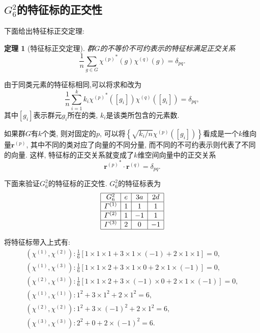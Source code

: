 \documentclass[UTF8]{ctexart}
\newtheorem{thm}{定理}
\begin{document}
\subsection{$G_6^2$的特征标的正交性}
下面给出特征标正交定理:
\begin{thm}[特征标正交定理]
  群$G$的不等价不可约表示的特征标满足正交关系
  \begin{equation}
    \frac{1}{n} \sum_{g \in G} {\chi^{(p)}}^{*} (g) \chi^{(q)} (g) = \delta_{pq}.
  \end{equation}
\end{thm}

由于同类元素的特征标相同,可以将求和改为
\begin{equation}
  \frac{1}{n} \sum_{i = 1}^{k} k_i {\chi^{(p)}}^{*} ([g_i]) \chi^{(q)}([g_i]) = \delta_{pq},
\end{equation}
其中$[g_i]$表示群元$g_i$所在的类, $k_i$是该类所包含的元素数.

如果群$G$有$k$个类, 则对固定的$p$, 可以将$\left\{ \sqrt{k_i/n} \chi^{(p)}([g_i]) \right\}$看成是一个$k$维向量$\bm{r}^{(p)}$, 其中不同的类对应了向量的不同分量, 而不同的不可约表示则代表了不同的向量. 这样, 特征标的正交关系就变成了$k$维空间向量中的正交关系
\begin{equation}
  {\bm{r}^{(p)}}^{*} \cdot \bm{r}^{(q)} = \delta_{pq}.
\end{equation}

下面来验证$G_6^2$的特征标的正交性. $G_6^2$的特征标表为
\begin{equation}
  \begin{array}{|c|c|c|c|}
    \hline
    G_6^2 & e & 3a & 2d \\
    \hline
    \varGamma^{(1)} & 1 & 1 & 1 \\
    \hline
    \varGamma^{(2)} & 1 & -1 & 1 \\
    \hline
    \varGamma^{(3)} & 2 & 0 & -1 \\
    \hline
  \end{array}
\end{equation}

将特征标带入上式有:
\begin{gather}
  (\chi^{(1)}, \chi^{(2)}) : \frac{1}{6} [1\times 1\times 1 + 3\times 1\times (-1) + 2 \times 1 \times 1] = 0, \\
  (\chi^{(1)}, \chi^{(3)}) : \frac{1}{6} [1\times 1\times 2 + 3\times 1\times 0 + 2 \times 1 \times (-1)] = 0, \\
  (\chi^{(2)}, \chi^{(3)}) : \frac{1}{6} [1\times 1\times 2 + 3\times (-1)\times 0 + 2 \times 1 \times (-1)] = 0, \\
  (\chi^{(1)}, \chi^{(1)}) : 1^2 + 3\times 1^2 + 2 \times 1^2 = 6, \\
  (\chi^{(2)}, \chi^{(2)}) : 1^2 + 3\times (-1)^2 + 2 \times 1^2 = 6, \\
  (\chi^{(3)}, \chi^{(3)}) : 2^2 + 0 + 2 \times (-1)^2 = 6.
\end{gather}
\end{document}
